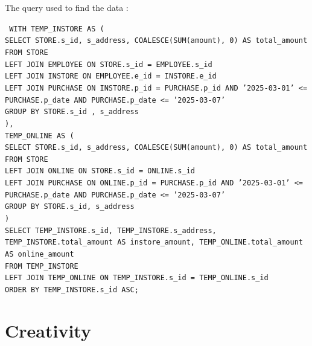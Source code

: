 \documentclass[a4paper,11pt]{article}
\begin{document}
The query used to find the data :
\newline

\noindent\texttt{
WITH TEMP\_INSTORE AS (\\
SELECT STORE.s\_id, s\_address, COALESCE(SUM(amount), 0) AS total\_amount\\
FROM STORE\\
LEFT JOIN EMPLOYEE ON STORE.s\_id = EMPLOYEE.s\_id\\
LEFT JOIN INSTORE ON EMPLOYEE.e\_id = INSTORE.e\_id\\
LEFT JOIN PURCHASE ON INSTORE.p\_id = PURCHASE.p\_id AND '2025-03-01' <= PURCHASE.p\_date AND PURCHASE.p\_date <= '2025-03-07'\\
GROUP BY STORE.s\_id , s\_address\\
),\\
TEMP\_ONLINE AS (\\
SELECT STORE.s\_id, s\_address, COALESCE(SUM(amount), 0) AS total\_amount\\
FROM STORE\\
LEFT JOIN ONLINE ON STORE.s\_id = ONLINE.s\_id\\
LEFT JOIN PURCHASE ON ONLINE.p\_id = PURCHASE.p\_id  AND '2025-03-01' <= PURCHASE.p\_date AND PURCHASE.p\_date <= '2025-03-07'\\
GROUP BY STORE.s\_id, s\_address\\
)\\
SELECT TEMP\_INSTORE.s\_id, TEMP\_INSTORE.s\_address, \\
TEMP\_INSTORE.total\_amount AS instore\_amount, TEMP\_ONLINE.total\_amount AS online\_amount\\
FROM TEMP\_INSTORE\\
LEFT JOIN TEMP\_ONLINE ON TEMP\_INSTORE.s\_id = TEMP\_ONLINE.s\_id\\
ORDER BY TEMP\_INSTORE.s\_id ASC;
}

\section*{Creativity}
\end{document}
